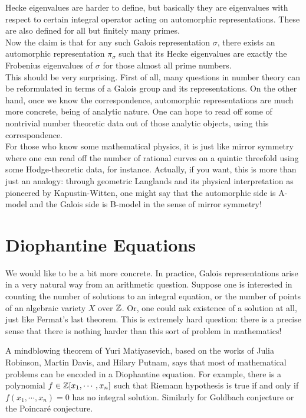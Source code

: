 Hecke eigenvalues are harder to define, but basically they are eigenvalues with respect to certain integral operator acting on automorphic representations. These are also defined for all but finitely many primes.\\

Now the claim is that for any such Galois representation $\sigma$, there exists an automorphic representation $\pi_\sigma$ such that its Hecke eigenvalues are exactly the Frobenius eigenvalues of $\sigma$ for those almost all prime numbers.\\

This should be very surprising. First of all, many questions in number theory can be reformulated in terms of a Galois group and its representations. On the other hand, once we know the correspondence, automorphic representations are much more concrete, being of analytic nature. One can hope to read off some of nontrivial number theoretic data out of those analytic objects, using this correspondence.\\

For those who know some mathematical physics, it is just like mirror symmetry where one can read off the number of rational curves on a quintic threefold using some Hodge-theoretic data, for instance. Actually, if you want, this is more than just an analogy: through geometric Langlands and its physical interpretation as pioneered by Kapustin-Witten, one might say that the automorphic side is A-model and the Galois side is B-model in the sense of mirror symmetry!

\section{Diophantine Equations}

We would like to be a bit more concrete. In practice, Galois representations arise in a very natural way from an arithmetic question. Suppose one is interested in counting the number of solutions to an integral equation, or the number of points of an algebraic variety $X$ over $\mathbb{Z}$. Or, one could ask existence of a solution at all, just like Fermat's last theorem. This is extremely hard question: there is a precise sense that there is nothing harder than this sort of problem in mathematics!

\begin{rem*}
A mindblowing theorem of Yuri Matiyasevich, based on the works of Julia Robinson, Martin Davis, and Hilary Putnam, says that most of mathematical problems can be encoded in a Diophantine equation. For example, there is a polynomial $f \in \mathbb{Z}[x_1,\cdots,x_n]$ such that Riemann hypothesis is true if and only if $f(x_1,\cdots,x_n)=0$ has no integral solution. Similarly for Goldbach conjecture or the Poincar\'e conjecture.
\end{rem*}

